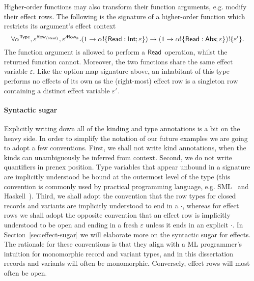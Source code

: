 \documentclass[12pt,phd,lfcs,twoside,openright,logo,leftchapter,normalheadings]{infthesis}
\theoremstyle{plain}
\theoremstyle{definition}
\begin{document}
Higher-order functions may also transform their function arguments,
e.g. modify their effect rows. The following is the signature of a
higher-order function which restricts its argument's effect context
%
\[
  \forall \alpha^{\mathsf{Type}}, \varepsilon^{\mathsf{Row}_{\{\mathsf{Read}\}}},\varepsilon'^{\mathsf{Row}_\emptyset}. (1 \to \alpha ! \{\mathsf{Read}:\mathsf{Int};\varepsilon\}) \to (1 \to \alpha ! \{\mathsf{Read}:\mathsf{Abs};\varepsilon\}) ! \{\varepsilon'\}.
\]
%
The function argument is allowed to perform a $\mathsf{Read}$ operation,
whilst the returned function cannot. Moreover, the two functions share
the same effect variable $\varepsilon$. Like the option-map signature
above, an inhabitant of this type performs no effects of its own as
the (right-most) effect row is a singleton row containing a distinct
effect variable $\varepsilon'$.

\paragraph{Syntactic sugar}
Explicitly writing down all of the kinding and type annotations is a
bit on the heavy side. In order to simplify the notation of our future
examples we are going to adopt a few conventions. First, we shall not
write kind annotations, when the kinds can unambiguously be inferred
from context. Second, we do not write quantifiers in prenex
position. Type variables that appear unbound in a signature are
implicitly understood be bound at the outermost level of the type
(this convention is commonly used by practical programming language,
e.g. SML~\cite{MilnerTHM97} and
Haskell~\cite{JonesABBBFHHHHJJLMPRRW99}). Third, we shall adopt the
convention that the row types for closed records and variants are
implicitly understood to end in a $\cdot$, whereas for effect rows we
shall adopt the opposite convention that an effect row is implicitly
understood to be open and ending in a fresh $\varepsilon$ unless it
ends in an explicit $\cdot$. In Section~\ref{sec:effect-sugar} we will
elaborate more on the syntactic sugar for effects. The rationale for
these conventions is that they align with a ML programmer's intuition
for monomorphic record and variant types, and in this dissertation
records and variants will often be monomorphic. Conversely, effect
rows will most often be open.
\end{document}
